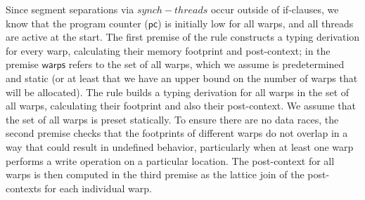Since segment separations via $\mathit{synch-threads}$ occur outside of if-clauses, we know that the program counter ($\mathsf{pc}$) is initially low for all warps, and all threads are active at the start.
%
The first premise of the rule constructs a typing derivation for every warp, calculating their memory footprint and post-context; in the premise $\mathsf{warps}$ refers to the set of all warps, which we assume is predetermined and static (or at least that we have an upper bound on the number of warps that will be allocated).
% 
The rule builds a typing derivation for all warps in the set of all warps, calculating their footprint and also their post-context. We assume that the set of all warps is preset statically.
%
To ensure there are no data races, the second premise checks that the footprints of different warps do not overlap in a way that could result in undefined behavior, particularly when at least one warp performs a write operation on a particular location.
%
 The post-context for all warps is then computed in the third premise as the lattice join of the post-contexts for each individual warp.


%


